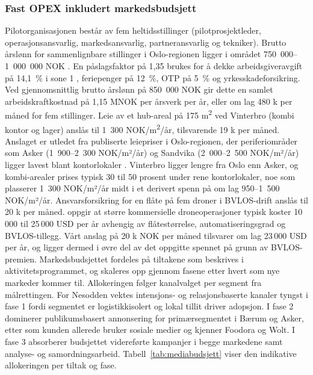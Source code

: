 \subsubsection{Fast OPEX inkludert markedsbudsjett}
\label{app:fastopex}

Pilotorganisasjonen består av fem heltidsstillinger
(pilotprosjektleder, operasjonsansvarlig, markedsansvarlig,
partneransvarlig og tekniker). Brutto årslønn for sammenlignbare
stillinger i Oslo-regionen ligger i området 750~000--1~000~000 NOK
\parencite{ssb2025_lonn, tekna2025}. En påslagsfaktor
på 1{,}35 brukes for å dekke arbeidsgiveravgift på 14{,}1~\% i sone 1
\parencite{skatteetaten2025}, feriepenger på 12~\%, OTP på 5~\% og
yrkesskadeforsikring. Ved gjennomsnittlig brutto årslønn på 850~000 NOK
gir dette en samlet arbeidskraftkostnad på 1{,}15 MNOK per årsverk per
år, eller om lag 480 k per måned for fem stillinger. Leie av et
hub-areal på 175 m\textsuperscript{2} ved Vinterbro (kombi kontor og
lager) anslås til 1~300 NOK/m\textsuperscript{2}/år, tilsvarende 19 k
per måned. Anslaget er utledet fra publiserte leiepriser i
Oslo-regionen, der periferiområder som Asker (1~900--2~300 NOK/m²/år) og
Sandvika (2~000--2~500 NOK/m²/år) ligger lavest blant kontorlokaler
\parencite{spacefinder2025}. Vinterbro ligger lengre fra Oslo enn
Asker, og kombi-arealer prises typisk 30 til 50 prosent under rene
kontorlokaler, noe som plasserer 1~300 NOK/m²/år midt i et derivert spenn på
om lag 950--1~500 NOK/m²/år. Ansvarsforsikring
for en flåte på fem droner i BVLOS-drift anslås til 20 k per måned.
\textcite{bwi_droneinsurance} oppgir at større kommersielle droneoperasjoner
typisk koster 10\,000 til 25\,000 USD per år avhengig av flåtestørrelse,
automatiseringsgrad og BVLOS-tillegg. Vårt anslag på 20 k NOK per
måned tilsvarer om lag 23\,000 USD per år, og ligger dermed i øvre del
av det oppgitte spennet på grunn av BVLOS-premien. Markedsbudsjettet fordeles på tiltakene som beskrives i
aktivitetsprogrammet, og skaleres opp gjennom fasene etter hvert som
nye markeder kommer til. Allokeringen følger kanalvalget per segment
fra målrettingen. For Nesodden vektes intensjons- og relasjonsbaserte
kanaler tyngst i fase 1 fordi segmentet er logistikkisolert og lokal
tillit driver adopsjon. I fase 2 dominerer publikumsbasert annonsering
for primærsegmentet i Bærum og Asker, etter som kunden allerede bruker
sosiale medier og kjenner Foodora og Wolt. I fase 3 absorberer
budsjettet videreførte kampanjer i begge markedene samt analyse- og
samordningsarbeid. Tabell~\ref{tab:mediabudsjett} viser den indikative
allokeringen per tiltak og fase.

